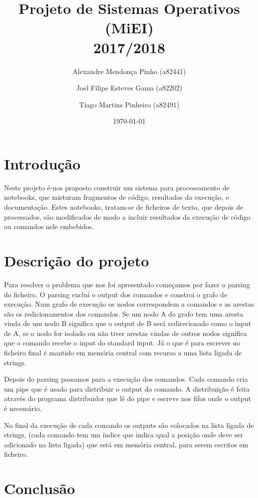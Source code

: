 \documentclass[12pt]{report}
\title{Projeto de Sistemas Operativos (MiEI) \\ 2017/2018}
\author{Alexandre Mendonça Pinho (a82441) \and Joel Filipe Esteves Gama (a82202) \and Tiago Martins Pinheiro (a82491)}
\date{\today}
\newcommand\tab[1][0.5cm]{\hspace*{#1}}
\begin{document}
\maketitle

\tableofcontents

\chapter{Introdução}
\label{sec:introducao}

\tab Neste projeto é-nos proposto construir um sistema para processamento de notebooks, que misturam fragmentos de código, resultados da execução, e documentação. Estes notebooks, tratam-se de ficheiros de texto, que depois de processados, são modificados de modo a incluir resultados da execução de código ou comandos nele embebidos.

\chapter{Descrição do projeto}
\label{sec:descricao}

\tab Para resolver o problema que nos foi apresentado começamos por fazer o parsing do ficheiro. O parsing excluí o output dos comandos e constroi o grafo de execução. Num grafo de execução os nodos correspondem a comandos e as arestas são os redicionamentos dos comandos. Se um nodo A do grafo tem uma aresta vinda de um nodo B significa que o output de B será redirecionado como o input de A, se o nodo for isolado ou não tiver arestas vindas de outros nodos significa que o comando recebe o input do standard input. Já o que é para escrever no ficheiro final é mantido em memória central com recurso a uma lista ligada de strings.

Depois do parsing passamos para a execução dos comandos. Cada comando cria um pipe que é usado para distribuir o output do comando. A distribuição é feita através do programa distribuidor que lê do pipe e escreve nos fifos onde o output é necessário.

No final da execução de cada comando os outputs são colocados na lista ligada de strings, (cada comando tem um índice que indica qual a posição onde deve ser adicionado na lista ligada) que está em memória central, para serem escritos em ficheiro.

\chapter{Conclusão}
\label{sec:conclusao}
\end{document}
